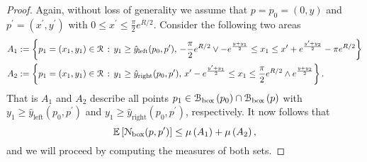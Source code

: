 \begin{proof}
Again, without loss of generality we assume that $p = p_0 = (0,y)$ and $p^\prime = (x^\prime, y^\prime)$ with $0 \le x^\prime \le \frac{\pi}{2} e^{R/2}$. Consider the following two areas
\begin{align*}
	A_1 &:= \left\{p_1 = (x_1,y_1) \in {\mathcal R} \, : \, y_1 \ge \hat{y}_{\text{left}}(p_0,p^\prime), \, 
		-\frac{\pi}{2} e^{R/2} \vee - e^{\frac{y + y_1}{2}} \le x_1 \le x^\prime + e^{\frac{y^\prime + y_2}{2}} - \pi e^{R/2} \right\}\\
	A_2 &:= \left\{p_1 = (x_1,y_1) \in {\mathcal R} \, : \, y_1 \ge \hat{y}_{\text{right}}(p_0,p^\prime), \,
			x^\prime - e^{\frac{y^\prime + y_1}{2}} \le x_1 \le \frac{\pi}{2} e^{R/2} \wedge e^{\frac{y + y_2}{2}} \right\}.
\end{align*}
That is $A_1$ and $A_2$ describe all points $p_1 \in {\mathcal B}_{\text{box}}\left(p_0\right) \cap {\mathcal B}_{\text{box}}\left(p\right)$ with $y_1 \ge \hat{y}_{\text{left}}(p_0,p^\prime)$ and $y_1 \ge \hat{y}_{\text{right}}(p_0,p^\prime)$, respectively. It now follows that
\[
	\mathbb{E}\left[{\mathcal N}_{\text{box}}(p,p^\prime)\right] \le \mu\left(A_1\right) + \mu\left(A_2\right),
\]
and we will proceed by computing the measures of both sets. 


\end{proof}
